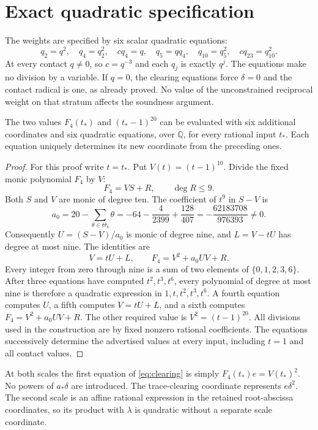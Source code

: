 \documentclass[11pt,a4paper]{article}
\newcommand{\Q}{\mathbb Q}\newcommand{\Z}{\mathbb Z}\newcommand{\HH}{\mathcal H}
\begin{document}
\section{Exact quadratic specification}
The weights are specified by six scalar quadratic equations:
\[
 q_2=q^2,\quad q_4=q_2^2,\quad c q_4=q,\quad
 q_5=qq_4,\quad q_{10}=q_5^2,\quad c q_{23}=q_{10}^2.
\]
At every contact $q\ne0$, so $c=q^{-3}$ and each $q_j$ is exactly
$q^j$. The equations make no division by a variable. If $q=0$, the
clearing equations force $\delta=0$ and the contact radical is one,
as already proved. No value of the unconstrained reciprocal weight
on that stratum affects the soundness argument.

\begin{lemma}\label{lem:contactcircuit}
The two values $F_4(t_*)$ and $(t_*-1)^{20}$ can be evaluated with
six additional coordinates and six quadratic equations, over $\Q$,
for every rational input $t_*$. Each equation uniquely determines its
new coordinate from the preceding ones.
\end{lemma}
\begin{proof}
For this proof write $t=t_*$. Put $V(t)=(t-1)^{10}$. Divide the fixed
monic polynomial $F_4$ by $V$:
\[
 F_4=VS+R,\qquad \deg R\le9.
\]
Both $S$ and $V$ are monic of degree ten. The coefficient of $t^9$
in $S-V$ is
\[
 a_0=20-\sum_{\theta\in\Theta_4}\theta
     =-64-\frac4{2399}+\frac{128}{407}
     =-\frac{62183708}{976393}\ne0.
\]
Consequently $U=(S-V)/a_0$ is monic of degree nine, and
$L=V-tU$ has degree at most nine. The identities are
\[
              V=tU+L,\qquad F_4=V^2+a_0UV+R.
\]
Every integer from zero through nine is a sum of two elements of
$\{0,1,2,3,6\}$. After three equations have computed
$t^2,t^3,t^6$, every polynomial of degree at most nine is therefore
a quadratic expression in $1,t,t^2,t^3,t^6$. A fourth equation
computes $U$, a fifth computes $V=tU+L$, and a sixth computes
$F_4=V^2+a_0UV+R$. The other required value is $V^2=(t-1)^{20}$.
All divisions used in the construction are by fixed nonzero rational
coefficients. The equations successively determine the advertised
values at every input, including $t=1$ and all contact values.
\end{proof}

At both scales the first equation of \eqref{eq:clearing} is simply
$F_4(t_*)e=V(t_*)^2$. No powers of $a_*\delta$ are introduced.
The trace-clearing coordinate represents $e\delta^2$.
The second scale is an affine rational expression in the retained
root-abscissa coordinates, so its product with $\lambda$ is quadratic
without a separate scale coordinate.
\end{document}
